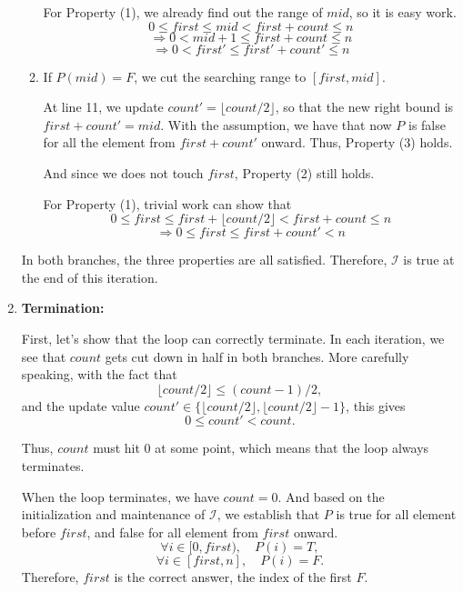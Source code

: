 \documentclass[12pt]{article}
\begin{document}
\begin{enumerate}
\begin{enumerate}
        For Property (1), we already find out the range of \(mid\), so it is easy work.
        \[
            0 \leq first \leq mid < first + count \leq n
        \]
        \[
            \Rightarrow 0 < mid + 1 \leq first + count \leq n
        \]
        \[
            \Rightarrow 0 < first' \leq first' + count' \leq n
        \]

        \item If \(P(mid) = F\), we cut the searching range to \([first, mid]\).

        At line 11, we update \(count' = \lfloor count / 2 \rfloor\), so that the new right bound is \(first + count' = mid\). With the assumption, we have that now \(P\) is false for all the element from \(first + count'\) onward. Thus, Property (3) holds.

        And since we does not touch \(first\), Property (2) still holds.

        For Property (1), trivial work can show that
        \[
            0 \leq first \leq first + \lfloor count / 2 \rfloor < first + count \leq n
        \]
        \[
            \Rightarrow 0 \leq first \leq first + count' < n
        \]
    \end{enumerate}

    In both branches, the three properties are all satisfied. Therefore, \(\mathcal{I}\) is true at the end of this iteration.

    \item \textbf{Termination:}

    First, let's show that the loop can correctly terminate. In each iteration, we see that \(count\) gets cut down in half in both branches. More carefully speaking, with the fact that
    \[
        \lfloor count / 2 \rfloor \leq (count-1) / 2,
    \]
    and the update value \(count' \in \{\lfloor count / 2 \rfloor, \lfloor count / 2 \rfloor - 1\}\), this gives
    \[
        0 \leq count' < count.
    \]

    Thus, \(count\) must hit 0 at some point, which means that the loop always terminates.

    When the loop terminates, we have \(count = 0\). And based on the initialization and maintenance of \(\mathcal{I}\), we establish that \(P\) is true for all element before \(first\), and false for all element from \(first\) onward.
    \[
        \forall i \in [0, first), \quad P(i) = T,
    \]
    \[
        \forall i \in [first, n], \quad P(i) = F.
    \]
    Therefore, \(first\) is the correct answer, the index of the first \(F\).
\end{enumerate}
\end{document}
